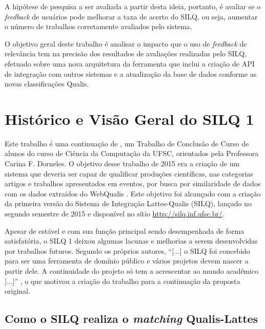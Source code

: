 \documentclass[12pt]{article}
\newcommand{\quotes}[1]{``#1''}
\begin{document}
A hipótese de pesquisa a ser avaliada a partir desta ideia, portanto, é avaliar se o \textit{feedback} de usuários pode melhorar a taxa de acerto do SILQ, ou seja, aumentar o número de trabalhos corretamente avaliados pelo sistema.

O objetivo geral deste trabalho é analisar o impacto que o uso de \textit{feedback} de relevância tem na precisão dos resultados de avaliações realizadas pelo SILQ, efetuado sobre uma nova arquitetura da ferramenta que inclui a criação de API de integração com outros sistemas e a atualização da base de dados conforme as novas classificações Qualis.

\section{Histórico e Visão Geral do SILQ 1}\label{cap:dev1}

Este trabalho é uma continuação de \cite{Silq1}, um Trabalho de Conclusão de Curso de alunos do curso de Ciência da Computação da UFSC, orientados pela Professora Carina F. Dorneles. O objetivo desse trabalho de 2015 era a criação de um sistema que deveria ser capaz de qualificar produções científicas, nas categorias artigos e trabalhos apresentados em eventos, por busca por similaridade de dados com os dados extraídos do WebQualis \cite[p. 26-27]{Silq1}. Este objetivo foi alcançado com a criação da primeira versão do Sistema de Integração Lattes-Qualis (SILQ), lançado no segundo semestre de 2015 e disponível no sítio \url{http://silq.inf.ufsc.br/}.

Apesar de estável e com sua função principal sendo desempenhada de forma satisfatória, o SILQ 1 deixou algumas lacunas e melhorias a serem desenvolvidas por trabalhos futuros. Segundo os próprios autores, \quotes{[...] o SILQ foi concebido para ser uma ferramenta de domínio público e vários projetos devem nascer a partir dele. A continuidade do projeto só tem a acrescentar ao mundo acadêmico [...]} \cite[p. 79]{Silq1}, o que motivou a criação do trabalho para a continuação da proposta original.

\subsection{Como o SILQ realiza o \textit{matching} Qualis-Lattes} \label{sec:algoritmo-silq1}
\end{document}

